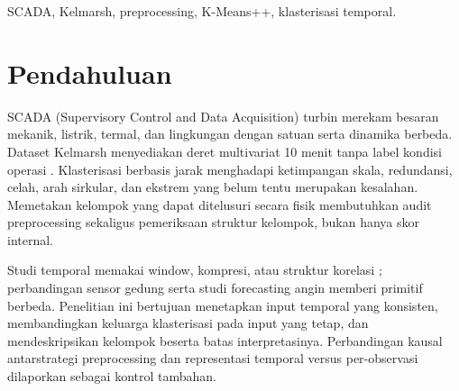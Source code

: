 \documentclass[conference]{IEEEtran}
\begin{document}
\maketitle
\raggedbottom

\begin{abstract}
Penelitian ini mengklasterkan kondisi operasi tanpa label pada SCADA enam turbin Kelmarsh 2022. Dari 315.360 slot 10 menit, 314.018 observasi tersedia. Preprocessing berbasis benchmark mempertahankan ekstrem berflag, mengisi 19 sel ambien, dan menghasilkan 52.241 window satu jam dengan 60 fitur statistik dari 11 variabel fisik; standardisasi ditetapkan pada Januari--Juni dan Juli--Desember dipakai untuk seleksi, bukan pengujian independen. K-Means++, Fuzzy C-Means, HDBSCAN, dan Ward diuji pada $k=2$--10. K-Means++ $k=2$ memperoleh Silhouette 0,32954, Davies--Bouldin 1,85605, dan Calinski--Harabasz 4071,28; FCM degeneratif dan HDBSCAN memberi inti padat dengan cakupan parsial. Refit deskriptif menghasilkan dua kelompok (10.405 dan 41.836 window) yang dibedakan oleh daya, putaran, dan pitch, bukan label fault. Kontrol terkendali menunjukkan pilihan skala paling menentukan struktur, sedangkan representasi temporal menstabilkan label.
\end{abstract}
\begin{IEEEkeywords}
SCADA, Kelmarsh, preprocessing, K-Means++, klasterisasi temporal.
\end{IEEEkeywords}

\section{Pendahuluan}
SCADA (Supervisory Control and Data Acquisition) turbin merekam besaran mekanik, listrik, termal, dan lingkungan dengan satuan serta dinamika berbeda. Dataset Kelmarsh menyediakan deret multivariat 10 menit tanpa label kondisi operasi \cite{kelmarsh2025}. Klasterisasi berbasis jarak menghadapi ketimpangan skala, redundansi, celah, arah sirkular, dan ekstrem yang belum tentu merupakan kesalahan. Memetakan kelompok yang dapat ditelusuri secara fisik membutuhkan audit preprocessing sekaligus pemeriksaan struktur kelompok, bukan hanya skor internal.

Studi temporal memakai window, kompresi, atau struktur korelasi \cite{martipuig2024,bonifati2022,bette2023}; perbandingan sensor gedung \cite{ngophan2025} serta studi forecasting angin \cite{cai2025} memberi primitif berbeda. Penelitian ini bertujuan menetapkan input temporal yang konsisten, membandingkan keluarga klasterisasi pada input yang tetap, dan mendeskripsikan kelompok beserta batas interpretasinya. Perbandingan kausal antarstrategi preprocessing dan representasi temporal versus per-observasi dilaporkan sebagai kontrol tambahan.
\end{document}
